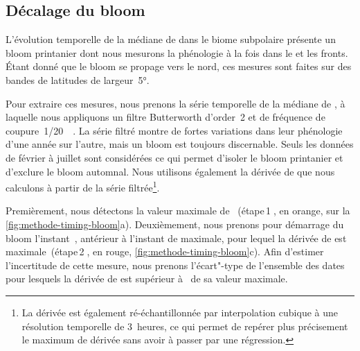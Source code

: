 \subsection{Décalage du bloom}
\label{sec:decalage-bloom}

L'évolution temporelle de la médiane de  dans le biome subpolaire présente un bloom printanier dont nous mesurons la phénologie  à la fois dans le  et les fronts.
Étant donné que le bloom se propage vers le nord, ces mesures sont faites sur des bandes de latitudes de largeur~\ang{5}.

Pour extraire ces mesures, nous prenons la série temporelle de la médiane de , à laquelle nous appliquons un filtre Butterworth d'order~2 et de fréquence de coupure~\qty[parse-numbers=false]{1/20}{\per\jours}.
La série filtré montre de fortes variations dans leur phénologie d'une année sur l'autre, mais un bloom est toujours discernable.
Seuls les données de février à juillet sont considérées ce qui permet d'isoler le bloom printanier et d'exclure le bloom automnal.
Nous utilisons également la dérivée de  que nous calculons à partir de la série filtrée\footnote{%
  La dérivée est également ré-échantillonnée par interpolation cubique à une résolution temporelle de 3~heures, ce qui permet de repérer plus précisement le maximum de dérivée sans avoir à passer par une régression.
}.

Premièrement, nous détectons la valeur maximale de ~(étape\,\textcircled{1}, en orange, sur la \cref{fig:methode-timing-bloom}a).
Deuxièmement, nous prenons pour démarrage du bloom l'instant~, antérieur à l'instant de  maximale, pour lequel la dérivée de  est maximale~(étape\,\textcircled{2}, en rouge, \cref{fig:methode-timing-bloom}c).
Afin d'estimer l'incertitude de cette mesure, nous prenons l'écart"-type de l'ensemble des dates pour lesquels la dérivée de  est supérieur à~ de sa valeur maximale.

